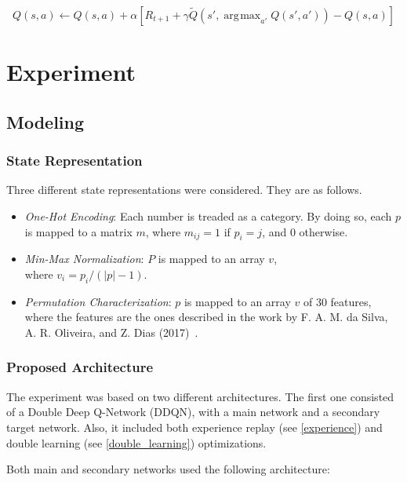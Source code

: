 \documentclass[11pt,twoside]{article}
\DeclareMathOperator*{\argmax}{\arg\!\max}
\begin{document}
\begin{equation}\label{double_equation}
	Q(s, a) \leftarrow Q(s, a) + \alpha [R_{t+1} + \gamma \widetilde{Q}(s', \argmax_{a'}{Q(s', a')}) - Q(s,a)]
\end{equation}


\section{Experiment}

\subsection{Modeling}

\subsubsection{State Representation}

Three different state representations were considered. They are as follows.

\begin{itemize}
	\item \textit{One-Hot Encoding}: Each number is treaded as a category. By doing so, each $p$ is mapped to a matrix $m$, where $m_{ij} = 1$ if $p_i = j$, and $0$ otherwise. 
	\item \textit{Min-Max Normalization}: $P$ is mapped to an array $v$,\\ where $v_i = p_i / (|p| - 1)$.
	\item \textit{Permutation Characterization}: $p$ is mapped to an array $v$ of $30$ features, where the features are the ones described in the work by F. A. M. da Silva, A. R. Oliveira, and Z. Dias (2017)~\cite{flavio}.
\end{itemize}

\subsubsection{Proposed Architecture}

The experiment was based on two different architectures. The first one consisted of a Double Deep Q-Network (DDQN), with a main network and a secondary target network. Also, it included both experience replay (see \ref{experience}) and double learning (see \ref{double_learning}) optimizations.

Both main and secondary networks used the following architecture:
\end{document}
